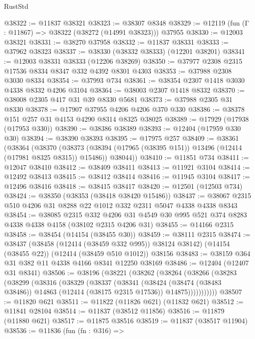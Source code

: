\begin{lexlean}{RustStd}
\begin{coremodule}
{\begin{coremodule}
{{{{{{{{{{{{{{{{{{{{{{{{{{{{{{{{{{{{{{{{{{{{{{{{{{@38322 := @11837 @38321
@38323 := @38307 @8348
@38329 := @12119 (fun (Γ : @11867) => @38322 (@38272 (@14991 @38323))) @37955
@38330 := @12003 @38321
@38331 := @38270 @37958
@38332 := @11837 @38331
@38333 := @37962 @38323
@38337 := @38330 (@38332 @38333) (@12201 @38201)
@38341 := @12003 @38331 @38333 (@12206 @38269)
@38350 := @37977 @2308 @2315 @17536 @8334 @8347 @332 @4392 @8301 @4303
@38353 := @37988 @2308 @3030 @8334
@38354 := @37993 @734
@38361 := @38354 @2307 @1418 @3030 @4338 @8332 @4206 @3104
@38364 := @38003 @2307 @1418 @8332
@38370 := @38008 @2305 @417 @31 @39 @8330 @5681
@38373 := @37988 @2305 @31 @8330
@38378 := @17907 @37955 @4206 @4206 @370 @330
@38386 := @38378 @151 @257 @31 @4153 @4290 @8314 @8325 @38025
@38389 := @17929 (@17938 (@17953 @330))
@38390 := @38386 @38389
@38393 := @12404 (@17959 @330 @30)
@38394 := @38390 @38393
@38395 := @17975 @257
@38409 := @38361
    (@38364
      (@38370
        (@38373 (@38394 (@17965 (@38395 @151)) @13496 (@12414 (@17981 @8325 @8315)) @15486))
        @38044))
@38410 := @11851 @734
@38411 := @12047 @38410
@38412 := @38409 @38411
@38413 := @11921 @3104
@38414 := @12492 @38413
@38415 := @38412 @38414
@38416 := @11945 @3104
@38417 := @12496 @38416
@38418 := @38415 @38417
@38420 := @12501 (@12503 @734)
@38424 := @38350 (@38353 (@38418 @38420 @15486))
@38437 := @38067 @2315 @510 @4206 @31 @8288 @22 @1012 @332 @2311 @5047 @4338 @4338 @8343
@38454 := @38085
    @2315
    @332
    @4206
    @31
    @4549
    @30
    @995
    @521
    @374
    @8283
    @4338
    @4338
    @4158
    (@38102 @2315 @4206 @31)
@38455 := @14166 @2315
@38458 := @38454 (@14154 (@38455 @30))
@38459 := @38111 @2315
@38474 := @38437
    (@38458 (@12414 (@38459 @332 @995)) @38124 @38142)
    (@14154 (@38455 @22))
    (@12414 (@38459 @510 @1012))
    @38156
@38483 := @38159 @364 @31 @382 @11 @4338 @4166 @8341 @12250 @38169
@38486 := @12404 (@12407 @31 @8341)
@38506 := @38196
    (@38221
      (@38262
        (@38264
          (@38266
            (@38283
              (@38299
                (@38316
                  (@38329
                    (@38337
                      (@38341
                        (@38424
                          (@38474 (@38483 @38486))
                          @14863
                          (@12414 (@38175 @2315 @17536))
                          @14875)))))))))))
@38507 := @11820 @621
@38511 := @11822 (@11826 @621) (@11832 @621)
@38512 := @11841 @28104
@38514 := @11837 (@38512 @11856)
@38516 := @11879 (@11880 @621)
@38517 := @11875 @38516
@38519 := @11837 (@38517 @11904)
@38536 := @11836
    (fun (fn : @316) =>
}}}}}}}}}}}}}}}}}}}}}}}}}}}}}}}}}}}}}}}}}}}}}}}}}}
\end{coremodule}}
\end{coremodule}
\end{lexlean}
